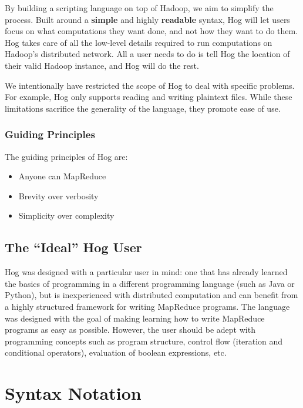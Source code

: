 \documentclass{report}
\begin{document}
By building a scripting language on top of Hadoop, we aim to simplify the process.
Built around a \textbf{simple} and highly \textbf{readable} syntax, Hog will let
users focus on what computations they want done, and not how they want to do them.
Hog takes care of all the low-level details required to run computations on
Hadoop’s distributed network. All a user needs to do is tell Hog the location of
their valid Hadoop instance, and Hog will do the rest.

We intentionally have restricted the scope of Hog to deal with specific
problems.  For example, Hog only supports reading and writing plaintext files.
While these limitations sacrifice the generality of the language, they promote
ease of use.

\subsubsection{Guiding Principles} %
\label{ssub:guiding_principles}

The guiding principles of Hog are:

\begin{itemize}
  \item Anyone can MapReduce
  \item Brevity over verbosity
  \item Simplicity over complexity
\end{itemize}



\subsection{The ``Ideal'' Hog User} %
\label{sub:the_ideal_hog_user}

Hog was designed with a particular user in mind: one that has already learned
the basics of programming in a different programming language (such as Java or
Python), but is inexperienced with distributed computation and can benefit from
a highly structured framework for writing MapReduce programs. The language was
designed with the goal of making learning how to write MapReduce programs as
easy as possible. However, the user should be adept with programming concepts
such as program structure, control flow (iteration and conditional operators),
evaluation of boolean expressions, etc.



\section{Syntax Notation} %
\label{sec:syntax_notation}
\end{document}
